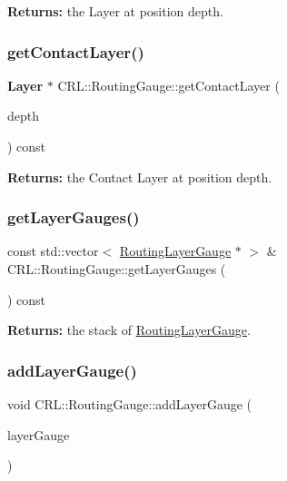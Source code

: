 {\bfseries Returns\+:} the Layer at position {\ttfamily depth}. \mbox{\label{classCRL_1_1RoutingGauge_a4b603c0fd5f21db1c93d8a747ec1f4ba}} 
\subsubsection{\texorpdfstring{get\+Contact\+Layer()}{getContactLayer()}}
{\footnotesize\ttfamily \textbf{ Layer} $\ast$ C\+R\+L\+::\+Routing\+Gauge\+::get\+Contact\+Layer (\begin{DoxyParamCaption}\item[{size\+\_\+t}]{depth }\end{DoxyParamCaption}) const}

{\bfseries Returns\+:} the Contact Layer at position {\ttfamily depth}. \mbox{\label{classCRL_1_1RoutingGauge_ae8cebef061519fb2df94e3a9dcf09e6e}} 
\subsubsection{\texorpdfstring{get\+Layer\+Gauges()}{getLayerGauges()}}
{\footnotesize\ttfamily const std\+::vector$<$ \hyperlink{classCRL_1_1RoutingLayerGauge}{Routing\+Layer\+Gauge} $\ast$ $>$ \& C\+R\+L\+::\+Routing\+Gauge\+::get\+Layer\+Gauges (\begin{DoxyParamCaption}{ }\end{DoxyParamCaption}) const}

{\bfseries Returns\+:} the stack of \hyperlink{classCRL_1_1RoutingLayerGauge}{Routing\+Layer\+Gauge}. \mbox{\label{classCRL_1_1RoutingGauge_a32313fbc68080e0b7e03b3e06dc1d9c5}} 
\subsubsection{\texorpdfstring{add\+Layer\+Gauge()}{addLayerGauge()}}
{\footnotesize\ttfamily void C\+R\+L\+::\+Routing\+Gauge\+::add\+Layer\+Gauge (\begin{DoxyParamCaption}\item[{\hyperlink{classCRL_1_1RoutingLayerGauge}{Routing\+Layer\+Gauge} $\ast$}]{layer\+Gauge }\end{DoxyParamCaption})}

